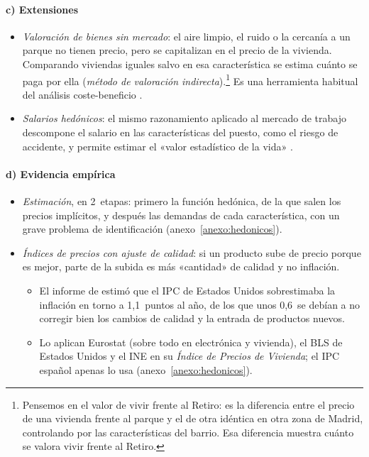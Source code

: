 \documentclass[11pt]{article}
\begin{document}
\paragraph{c) Extensiones}

\begin{itemize}
\item \emph{Valoración de bienes sin mercado}: el aire limpio, el ruido o la cercanía a un parque no tienen precio, pero se capitalizan en el precio de la vivienda. Comparando viviendas iguales salvo en esa característica se estima cuánto se paga por ella (\emph{método de valoración indirecta}).\footnote{Pensemos en el valor de vivir frente al Retiro: es la diferencia entre el precio de una vivienda frente al parque y el de otra idéntica en otra zona de Madrid, controlando por las características del barrio. Esa diferencia muestra cuánto se valora vivir frente al Retiro.} Es una herramienta habitual del análisis coste-beneficio .
\item \emph{Salarios hedónicos}: el mismo razonamiento aplicado al mercado de trabajo descompone el salario en las características del puesto, como el riesgo de accidente, y permite estimar el «valor estadístico de la vida» \parencite{ThalerRosen1976Value}.
\end{itemize}

\paragraph{d) Evidencia empírica}

\begin{itemize}
\item \emph{Estimación}, en 2~etapas: primero la función hedónica, de la que salen los precios implícitos, y después las demandas de cada característica, con un grave problema de identificación (anexo~\ref{anexo:hedonicos}).
\item \emph{Índices de precios con ajuste de calidad}: si un producto sube de precio porque es mejor, parte de la subida es más «cantidad» de calidad y no inflación.
  \begin{itemize}
  \item El informe de \textcite{Boskin1996Toward} estimó que el IPC de Estados Unidos sobrestimaba la inflación en torno a 1,1~puntos al año, de los que unos 0,6~se debían a no corregir bien los cambios de calidad y la entrada de productos nuevos.
  \item Lo aplican Eurostat (sobre todo en electrónica y vivienda), el BLS de Estados Unidos y el INE en su \emph{Índice de Precios de Vivienda}; el IPC español apenas lo usa (anexo~\ref{anexo:hedonicos}).
  \end{itemize}
\end{itemize}
\end{document}

